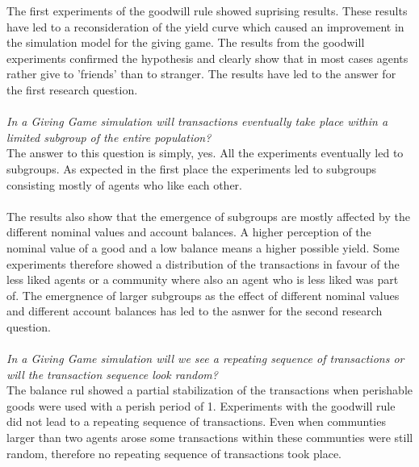 \documentclass[twoside,openright]{uva-bachelor-thesis}
\begin{document}
The first experiments of the goodwill rule showed suprising results. These results have led to a reconsideration of the yield curve which caused an improvement in the simulation model for the giving game. The results from the goodwill experiments confirmed the hypothesis and clearly show that in most cases agents rather give to 'friends' than to stranger. The results have led to the answer for the first research question. \\ 
\\
\textit{In a Giving Game simulation will transactions eventually take place within a limited subgroup of the entire population?} \\
The answer to this question is simply, yes. All the experiments eventually led to subgroups. As expected in the first place the experiments led to subgroups consisting mostly of agents who like each other.
\\
\\
The results also show that the emergence of subgroups are mostly affected by the different nominal values and account balances. A higher perception of the nominal value of a good and a low balance means a higher possible yield. Some experiments therefore showed a distribution of the transactions in favour of the less liked agents or a community where also an agent who is less liked was part of. The emergnence of larger subgroups as the effect of different nominal values and different account balances has led to the asnwer for the second research question.
\\
\\
\textit{In a Giving Game simulation will we see a repeating sequence of transactions or will the transaction sequence look random?} \\
The balance rul showed a partial stabilization of the transactions when perishable goods were used with a perish period of 1. Experiments with the goodwill rule did not lead to a repeating sequence of transactions. Even when communties larger than two agents arose some transactions within these communties were still random, therefore no repeating sequence of transactions took place.
\end{document}
